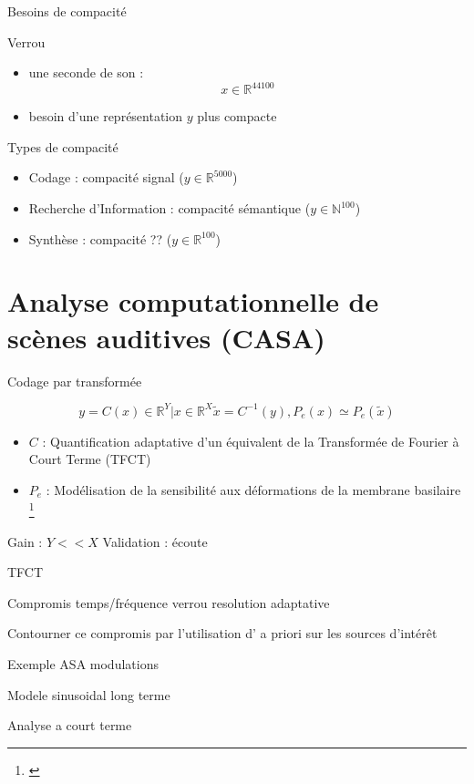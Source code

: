 \documentclass[compress]{beamer}
\let\oldfootnote\footnote
\renewcommand\footnote[1]{\let\thefootnote\relax%
\oldfootnote{#1}}
\newcommand\citenote[4]{\footnote{#3 \href{#2}{\structure{#1}} #4}}
\begin{document}
\begin{frame}{Besoins de compacité}
\begin{block}{Verrou}
\begin{itemize}
\item une seconde de son : $$ x \in \mathbb{R}^{44100}$$
\item besoin d'une représentation $y$ plus compacte
\end{itemize}
\end{block}
\begin{block}{Types de compacité}
\begin{itemize}
\item Codage : compacité signal ($ y \in \mathbb{R}^{5000}$)
\item Recherche d'Information : compacité sémantique ($ y \in \mathbb{N}^{100}$)
\item Synthèse : compacité  ?? ($ y \in \mathbb{R}^{100}$)
\end{itemize}
\end{block}
\end{frame}

\section[CASA]{Analyse computationnelle de scènes auditives (CASA)}

\begin{frame}{Codage par transformée}

$$y = C(x) \in \mathbb{R}^Y | x \in \mathbb{R}^{X} \tilde{x} = C^{-1}(y), P_e(x) \simeq P_e(\tilde{x})$$
\begin{itemize}
\item $C$ : Quantification adaptative d'un équivalent de la Transformée de Fourier à Court Terme (TFCT)
\item $P_e$ : Modélisation de la sensibilité aux déformations de la membrane basilaire\citenote{Zwicker}{}{}{}
\end{itemize}
Gain : $Y<<X$
Validation : écoute
\end{frame}

TFCT

Compromis temps/fréquence verrou resolution adaptative


Contourner ce compromis par l'utilisation d' a priori sur les sources d'intérêt

Exemple ASA modulations

Modele sinusoidal long terme

Analyse a court terme
\end{document}
